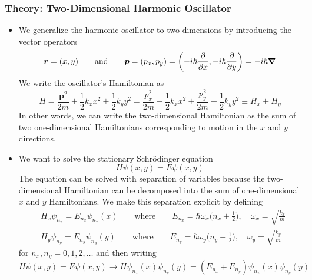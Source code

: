 \documentclass[11pt, a4paper]{article}
\newcommand{\eqtext}[1]{\qquad \text{#1} \qquad}
\newcommand{\schro}{Schr\"{o}dinger\xspace}
\renewcommand{\vec}[1]{\bm{#1}} %
\begin{document}
\subsubsection{Theory: Two-Dimensional Harmonic Oscillator}
\begin{itemize}
	\item We generalize the harmonic oscillator to two dimensions by introducing the vector operators
	\begin{equation*}
		\vec{r} = (x, y) \eqtext{and} \vec{p} = (p_{x}, p_{y}) = \left(-i\hbar \pdv{x}, -i \hbar \pdv{y}\right) = -i\hbar \grad
	\end{equation*}
	We write the oscillator's Hamiltonian as
	\begin{equation*}
		H = \frac{\vec{p}^{2}}{2m} + \frac{1}{2}k_{x}x^{2} + \frac{1}{2}k_{y}y^{2} = \frac{p_{x}^{2}}{2m} + \frac{1}{2}k_{x}x^{2} + \frac{p_{y}^{2}}{2m} + \frac{1}{2}k_{y}y^{2} \equiv H_{x} + H_{y}
	\end{equation*}
	In other words, we can write the two-dimensional Hamiltonian as the sum of two one-dimensional Hamiltonians corresponding to motion in the $ x $ and $ y $ directions. 
	
	\item We want to solve the stationary \schro equation
	\begin{equation*}
		H \psi(x, y) = E\psi(x, y)
	\end{equation*} 
	The equation can be solved with separation of variables because the two-dimensional Hamiltonian can be decomposed into the sum of one-dimensional $ x $ and $ y $ Hamiltonians. We make this separation explicit by defining
	\begin{align*}
		&H_{x}\psi_{n_{x}} = E_{n_{x}}\psi_{n_{x}}(x) \eqtext{where} E_{n_{x}} = \hbar \omega_{x}\big(n_{x} + \tfrac{1}{2}\big), \quad \omega_{x} = \sqrt{\frac{k_{x}}{m}}\\
		&H_{y}\psi_{n_{y}} = E_{n_{y}}\psi_{n_{y}}(y) \eqtext{where} E_{n_{y}} = \hbar \omega_{y}\big(n_{y} + \tfrac{1}{2}\big), \quad \omega_{y} = \sqrt{\frac{k_{y}}{m}}
	\end{align*}
	for $ n_{x}, n_{y} = 0, 1, 2, \ldots $ and then writing
	\begin{equation*}
		H\psi(x,y) = E\psi(x, y) \to H\psi_{n_{x}}(x)\psi_{n_{y}}(y) = (E_{n_{x}} + E_{n_{y}})\psi_{n_{x}}(x)\psi_{n_{y}}(y)
	\end{equation*}
	

\end{itemize}
\end{document}

